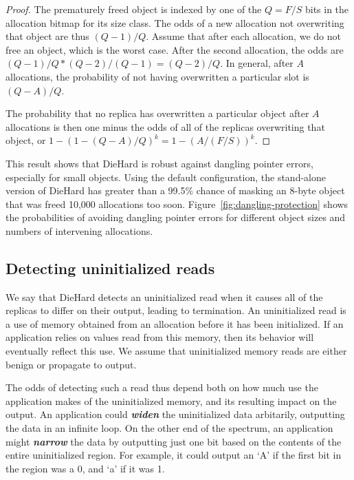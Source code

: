 \documentclass{sig-alternate}
\begin{document}
\vskip -20pt

\begin{proof}
The prematurely freed object is indexed by one of the $Q = F/S$ bits
in the allocation bitmap for its size class. The odds of a new
allocation not overwriting that object are thus $(Q-1)/Q$. Assume that
after each allocation, we do not free an object, which is the worst
case. After the second allocation, the odds are $(Q-1)/Q * (Q-2)/(Q-1)
= (Q-2)/Q$. In general, after $A$ allocations, the probability of not
having overwritten a particular slot is $(Q-A)/Q$.

The probability that no replica has overwritten a particular object
after $A$ allocations is then one minus the odds of all of the
replicas overwriting that object, or $1 - (1 - (Q-A)/Q)^k = 1 -
(A/(F/S))^k$.
\end{proof}

This result shows that DieHard is robust against dangling pointer
errors, especially for small objects. Using the default configuration,
the stand-alone version of DieHard has greater than a 99.5\% chance of
masking an 8-byte object that was freed 10,000 allocations too
soon. Figure~\ref{fig:dangling-protection} shows the probabilities of
avoiding dangling pointer errors for different object sizes and
numbers of intervening allocations.

\subsection{Detecting uninitialized reads}


\noindent
We say that DieHard detects an uninitialized read when it causes all
of the replicas to differ on their output, leading to termination. An
uninitialized read is a use of memory obtained from an allocation
before it has been initialized. If an application relies on values
read from this memory, then its behavior will eventually reflect this
use. We assume that uninitialized memory reads are either benign or
propagate to output.

The odds of detecting such a read thus depend both on how much use the
application makes of the uninitialized memory, and its resulting
impact on the output. An application could \emph{\bf widen} the
uninitialized data arbitarily, outputting the data in an infinite
loop. On the other end of the spectrum, an application might
\emph{\bf narrow} the data by outputting just one bit based on the
contents of the entire uninitialized region. For example, it could
output an `A' if the first bit in the region was a 0, and `a' if it
was 1.
\end{document}
